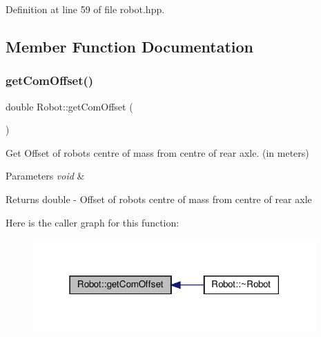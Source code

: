 Definition at line 59 of file robot.\+hpp.



\subsection{Member Function Documentation}
\mbox{\label{classRobot_a7ec7471708cfb59d26baefda819fa26b}} 
\subsubsection{\texorpdfstring{get\+Com\+Offset()}{getComOffset()}}
{\footnotesize\ttfamily double Robot\+::get\+Com\+Offset (\begin{DoxyParamCaption}{ }\end{DoxyParamCaption})}



Get Offset of robot\textquotesingle{}s centre of mass from centre of rear axle. (in meters) 


\begin{DoxyParams}{Parameters}
{\em void} & \\
\hline
\end{DoxyParams}
\begin{DoxyReturn}{Returns}
double -\/ Offset of robot\textquotesingle{}s centre of mass from centre of rear axle 
\end{DoxyReturn}
Here is the caller graph for this function\+:
\nopagebreak
\begin{figure}[H]
\begin{center}
\leavevmode
\includegraphics[width=307pt]{classRobot_a7ec7471708cfb59d26baefda819fa26b_icgraph}
\end{center}
\end{figure}
\mbox{\label{classRobot_a3e230967bf4b167aaa20d442c6c5ceb0}} 
